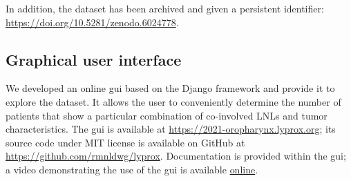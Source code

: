 \documentclass[\relativeRoot/main.tex]{subfiles}
\begin{document}
In addition, the dataset has been archived and given a persistent identifier: \url{https://doi.org/10.5281/zenodo.6024778}.

\subsection*{Graphical user interface}

We developed an online \gls{gui} based on the Django framework \cite{noauthor_django_2021} and provide it to explore the dataset. It allows the user to conveniently determine the number of patients that show a particular combination of co-involved LNLs and tumor characteristics. The \gls{gui} is available at \url{https://2021-oropharynx.lyprox.org}; its source code under MIT license is available on GitHub at \url{https://github.com/rmnldwg/lyprox}. Documentation is provided within the \gls{gui}; a video demonstrating the use of the \gls{gui} is available \href{https://www.sciencedirect.com/science/article/pii/S0167814022000615#s0100}{online}.
\end{document}
